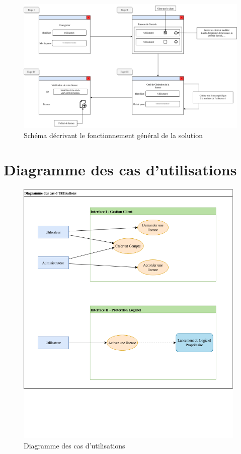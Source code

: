 \begin{figure}[hp]
	\centering
	\includegraphics[width=19cm]{main/STB.png}
	\caption{Schéma décrivant le fonctionnement général de la solution}
	\label{fig:fig1}
\end{figure}

\newpage

\section{Diagramme des cas d'utilisations}

\begin{figure}[hp]
	\centering
	\includegraphics[width=11cm]{main/Util.png}
	\caption{Diagramme des cas d'utilisations}
	\label{fig:fig2}
\end{figure}

